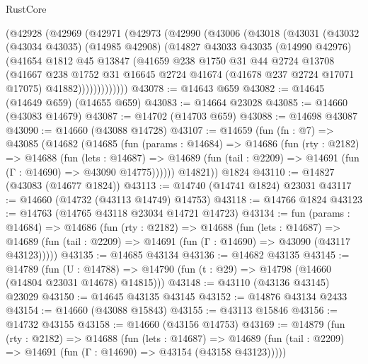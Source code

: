 \begin{lexlean}{RustCore}
\begin{coremodule}
    (@42928
      (@42969
        (@42971
          (@42973
            (@42990
              (@43006
                (@43018
                  (@43031
                    (@43032
                      (@43034 @43035)
                      (@14985 @42908)
                      (@14827
                        @43033
                        @43035
                        (@14990 @42976)
                        (@41654
                          @1812
                          @45
                          @13847
                          (@41659
                            @238
                            @1750
                            @31
                            @44
                            @2724
                            @13708
                            (@41667
                              @238
                              @1752
                              @31
                              @16645
                              @2724
                              @41674
                              (@41678 @237 @2724 @17071 @17075)
                              @41882)))))))))))))
@43078 := @14643 @659
@43082 := @14645 (@14649 @659) (@14655 @659)
@43083 := @14664 @23028
@43085 := @14660 (@43083 @14679)
@43087 := @14702 (@14703 @659)
@43088 := @14698 @43087
@43090 := @14660 (@43088 @14728)
@43107 := @14659
    (fun (fn : @7) =>
    @43085
      (@14682
        (@14685
          (fun (params : @14684) =>
          @14686
            (fun (rty : @2182) =>
            @14688
              (fun (lets : @14687) =>
              @14689 (fun (tail : @2209) => @14691 (fun (Γ : @14690) => @43090 @14775))))))
        @14821))
    @1824
@43110 := @14827 (@43083 (@14677 @1824))
@43113 := @14740 (@14741 @1824) @23031
@43117 := @14660 (@14732 (@43113 @14749) @14753)
@43118 := @14766 @1824
@43123 := @14763 (@14765 @43118 @23034 @14721 @14723)
@43134 := fun (params : @14684) =>
  @14686
    (fun (rty : @2182) =>
    @14688
      (fun (lets : @14687) =>
      @14689 (fun (tail : @2209) => @14691 (fun (Γ : @14690) => @43090 (@43117 @43123)))))
@43135 := @14685 @43134
@43136 := @14682 @43135
@43145 := @14789
    (fun (U : @14788) => @14790 (fun (t : @29) => @14798 (@14660 (@14804 @23031 @14678) @14815)))
@43148 := @43110 (@43136 @43145) @23029
@43150 := @14645 @43135 @43145
@43152 := @14876 @43134 @2433
@43154 := @14660 (@43088 @15843)
@43155 := @43113 @15846
@43156 := @14732 @43155
@43158 := @14660 (@43156 @14753)
@43169 := @14879
    (fun (rty : @2182) =>
    @14688
      (fun (lets : @14687) =>
      @14689 (fun (tail : @2209) => @14691 (fun (Γ : @14690) => @43154 (@43158 @43123)))))

\end{coremodule}
\end{lexlean}
